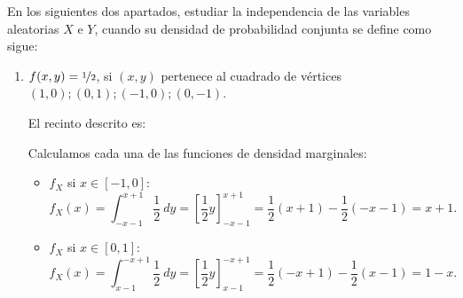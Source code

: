 \begin{ejercicio}
    En los siguientes dos apartados, estudiar la independencia de las variables aleatorias $X$ e $Y$, cuando su densidad de probabilidad conjunta se define como sigue:
    \begin{enumerate}
        \item $f(x, y) = \nicefrac{1}{2}$, si $(x, y)$ pertenece al cuadrado de vértices $(1,0);(0,1);(-1,0);(0,-1)$.
        
        El recinto descrito es:
        \begin{figure}[H]
            \centering
        \end{figure}

        Calculamos cada una de las funciones de densidad marginales:
        \begin{itemize}
            \item $f_X$ si $x \in [-1,0]$:
            \begin{equation*}
                f_X(x) = \int_{-x-1}^{x+1} \frac{1}{2} ~d{y} = \left[\frac{1}{2}y\right]_{-x-1}^{x+1} = \frac{1}{2}(x+1) - \frac{1}{2}(-x-1) = x+1.
            \end{equation*}

            \item $f_X$ si $x \in [0,1]$:
            \begin{equation*}
                f_X(x) = \int_{x-1}^{-x+1} \frac{1}{2} ~d{y} = \left[\frac{1}{2}y\right]_{x-1}^{-x+1} = \frac{1}{2}(-x+1) - \frac{1}{2}(x-1) = 1-x.
            \end{equation*}


\end{itemize}
\end{enumerate}
\end{ejercicio}

